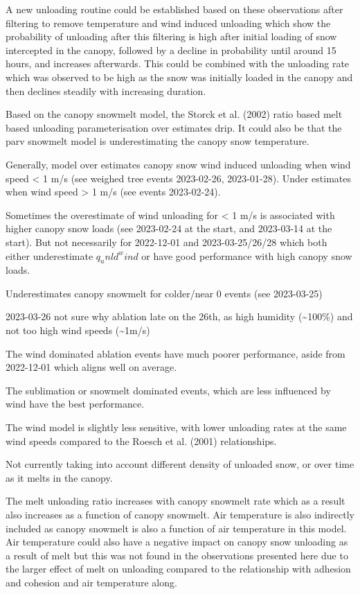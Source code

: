 \documentclass[
  letterpaper,
  DIV=11,
  numbers=noendperiod]{scrartcl}
\begin{document}
A new unloading routine could be established based on these observations
after filtering to remove temperature and wind induced unloading which
show the probability of unloading after this filtering is high after
initial loading of snow intercepted in the canopy, followed by a decline
in probability until around 15 hours, and increases afterwards. This
could be combined with the unloading rate which was observed to be high
as the snow was initially loaded in the canopy and then declines
steadily with increasing duration.

Based on the canopy snowmelt model, the Storck et al. (2002) ratio based
melt based unloading parameterisation over estimates drip. It could also
be that the parv snowmelt model is underestimating the canopy snow
temperature.

Generally, model over estimates canopy snow wind induced unloading when
wind speed \textless{} 1 m/s (see weighed tree events 2023-02-26,
2023-01-28). Under estimates when wind speed \textgreater{} 1 m/s (see
events 2023-02-24).

Sometimes the overestimate of wind unloading for \textless{} 1 m/s is
associated with higher canopy snow loads (see 2023-02-24 at the start,
and 2023-03-14 at the start). But not necessarily for 2022-12-01 and
2023-03-25/26/28 which both either underestimate \(q_unld^wind\) or have
good performance with high canopy snow loads.

Underestimates canopy snowmelt for colder/near 0 events (see 2023-03-25)

2023-03-26 not sure why ablation late on the 26th, as high humidity
(\textasciitilde100\%) and not too high wind speeds
(\textasciitilde1m/s)

The wind dominated ablation events have much poorer performance, aside
from 2022-12-01 which aligns well on average.

The sublimation or snowmelt dominated events, which are less influenced
by wind have the best performance.

The wind model is slightly less sensitive, with lower unloading rates at
the same wind speeds compared to the Roesch et al. (2001) relationships.

Not currently taking into account different density of unloaded snow, or
over time as it melts in the canopy.

The melt unloading ratio increases with canopy snowmelt rate which as a
result also increases as a function of canopy snowmelt. Air temperature
is also indirectly included as canopy snowmelt is also a function of air
temperature in this model. Air temperature could also have a negative
impact on canopy snow unloading as a result of melt but this was not
found in the observations presented here due to the larger effect of
melt on unloading compared to the relationship with adhesion and
cohesion and air temperature along.
\end{document}
